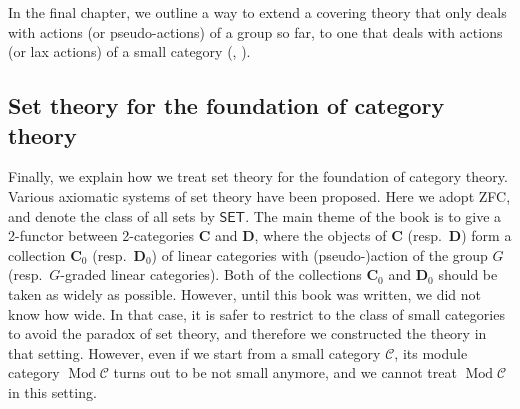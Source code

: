 \documentclass{surv-l}
\numberwithin{equation}{chapter}
\numberwithin{figure}{chapter}
\theoremstyle{plain}
\theoremstyle{definition}
\theoremstyle{remark}
\DeclareMathOperator{\Mod}{Mod}
\begin{document}
In the final chapter, we outline a way to extend a covering theory that only
deals with actions (or pseudo-actions) of a group so far, to one that deals with
actions (or lax actions) of a small category  (\cite{Asa-a}, \cite{Asa-b}).

\subsection*{Set theory for the foundation of category theory}
Finally, we explain how we treat set theory for the foundation of category theory.
Various axiomatic systems of set theory have been proposed.
Here we adopt ZFC, and denote the class of all sets by $\mathsf{SET}$.
The main theme of the book is to give a 2-functor between
2-categories $\mathbf{C}$ and $\mathbf{D}$,
where the objects of $\mathbf{C}$ (resp.\ $\mathbf{D}$) form
a collection $\mathbf{C}_0$ (resp.\ $\mathbf{D}_0$) of linear categories with (pseudo-)action of the group $G$
(resp.\ $G$-graded linear categories).
Both of the collections $\mathbf{C}_0$ and $\mathbf{D}_0$ should be taken as widely as possible.
However, until this book was written, we did not know how wide.
In that case, it is safer to restrict to the class of small categories to avoid the paradox of set theory,
and therefore we constructed the theory in that setting.
However, even if we start from a small category ${\mathcal{C}}$, its module category $\Mod {\mathcal{C}}$
turns out to be not small anymore, and we cannot treat $\Mod {\mathcal{C}}$ in this setting.
\end{document}
